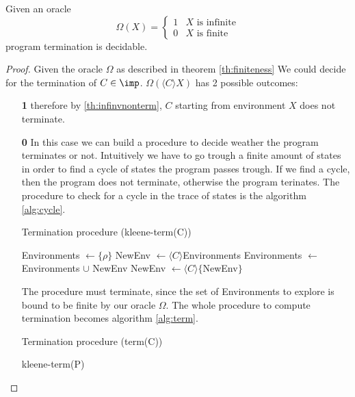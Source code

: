 \begin{theorem}\label{th:finiteness}
  Given an oracle
  \[
  \Omega(X) = \begin{cases}
    1 & X \text{ is infinite} \\
    0 & X \text{ is finite}
  \end{cases}
  \]
  program termination is decidable.
  
  \begin{proof}
    Given the oracle \(\Omega\) as described in theorem
    \ref{th:finiteness} We could decide for the termination of \(C \in
    \imp\). \(\Omega(\langle C \rangle X)\) has 2 possible outcomes:
    \begin{itemize}
    \item[\textbf{1}] therefore by \ref{th:infinvnonterm}, \(C\)
      starting from environment \(X\) does not terminate.
    \item[\textbf{0}] In this case we can build a procedure to decide
      weather the program terminates or not. Intuitively we have to go
      trough a finite amount of states in order to find a cycle of
      states the program passes trough. If we find a cycle, then the
      program does not terminate, otherwise the program terinates.
      The procedure to check for a cycle in the trace of states is the
      algorithm \ref{alg:cycle}.
      \begin{algorithm}
        \caption{Termination procedure (kleene-term(C))}\label{alg:term}
        \label{alg:cycle}
        \begin{algorithmic}
          \State Environments \(\gets \{\rho\}\)
          \State NewEnv \(\gets \langle C \rangle\)Environments
          \State Environments \(\gets\) Environments \(\cup\) NewEnv
          \State NewEnv \(\gets \langle C \rangle \{\)NewEnv\(\}\)
          \EndWhile

           \State {}
           \EndIf

          \State {} 
        \end{algorithmic}
      \end{algorithm}

      The procedure must terminate, since the set of Environments to
      explore is bound to be finite by our oracle \(\Omega\).  The
      whole procedure to compute termination becomes algorithm
      \ref{alg:term}.
      \begin{algorithm}
        \caption{Termination procedure (term(C))}\label{alg:term}
        \begin{algorithmic}
          \State \Return kleene-term(P)
          \EndIf
          \State {}
        \end{algorithmic}
      \end{algorithm}


\end{itemize}
\end{proof}
\end{theorem}
